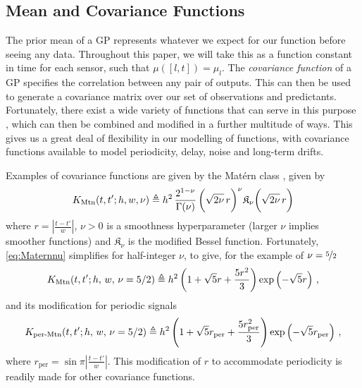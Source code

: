 \documentclass{acmsmall}
\newcommand{\Kl}[1]{K_{\text{#1}}}
\begin{document}
\subsection{Mean and Covariance Functions}

\noindent The prior mean of a GP represents whatever we expect for our function before seeing any data. Throughout this paper, we will take this as a function constant in time for each sensor, such that $\mu([l,t])=\mu_l$. The \emph{covariance function} of a GP specifies the correlation between any pair of outputs. This can then be used to generate a covariance matrix over our set of observations and predictants. Fortunately, there exist a wide variety of functions that can serve in this purpose \cite{Abrahamsen,stein2005stc}, which can then be combined and modified in a further multitude of ways. This gives us a great deal of flexibility in our modelling of functions, with covariance functions available to model periodicity, delay, noise and long-term drifts. 

Examples of covariance functions are given by the Mat\'{e}rn class \cite{GPsBook}, given by
\begin{equation} \label{eq:Maternnu}
\Kl{Mtn}(t,t';h,w,\nu)\defequal h^2\,\frac{2^{1-\nu}}{\Gamma(\nu)}\,\biggl(\sqrt{2\nu}\,r\biggr)^\nu \mathfrak{K}_\nu\biggl(\sqrt{2\nu}\,r\biggr)
\end{equation}
where $r = \left|\frac{t-t'}{w}\right|$, $\nu>0$ is a smoothness hyperparameter (larger $\nu$ implies smoother functions) and $\mathfrak{K}_\nu$ is the modified Bessel function. Fortunately, \eqref{eq:Maternnu} simplifies for half-integer $\nu$, to give, for the example of $\nu=\nicefrac{5}{2}$
\begin{equation} \label{eq:matern}
\Kl{Mtn}(t,t';h,\,w,\,\nu=5/2) \defequal h^2 \left(1+\sqrt{5}r+\frac{5r^2}{3}\right)\exp\left(-\sqrt{5}r\right)\,,
\end{equation}
and its modification for periodic signals
\begin{equation} \label{eq:permatern}
\Kl{per-Mtn}(t,t';h,\,w,\,\nu=5/2) \defequal h^2 \left(1+\sqrt{5}r_{\text{per}}+\frac{5r_{\text{per}}^2}{3}\right)\exp\left(-\sqrt{5}r_{\text{per}}\right)\,,
\end{equation}
where $r_{\text{per}} = \sin \pi \left|\frac{t-t'}{w}\right|$. This modification of $r$ to accommodate periodicity is readily made for other covariance functions.
\end{document}

